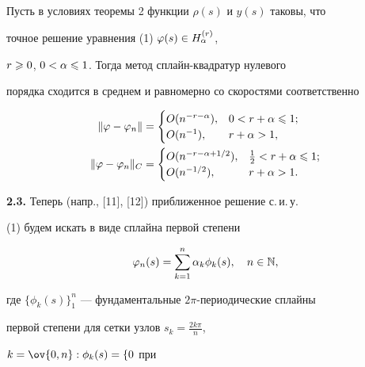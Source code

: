 \begin{cornonum}


Пусть в условиях теоремы 2 функции $\rho(s)$ и $y(s)$ таковы, что 


точное решение уравнения (1) $\varphi(s)\in H_\alpha^{(r)}$,


$r\geqslant 0$, $0<\alpha\leqslant 1$. Тогда метод сплайн-квадратур нулевого 


порядка сходится в среднем и равномерно со скоростями соответственно


\begin{align*}


\|\vp-\vp_n\| &=


\begin{cases}


O(n^{-r-\alpha}),& 0<r+\alpha\lea 1;\\


O(n^{-1}),&r+\alpha>1,


\end{cases}


\\


\|\vp-\vp_n\|_C &=


\begin{cases}


O(n^{-r-\alpha+1/2}),& \frac{1}{2}<r+\alpha\lea 1;\\


O(n^{-1/2}),&r+\alpha>1.


\end{cases}


\end{align*}


\end{cornonum}





{\bf 2.3.} Теперь (напр., [11], [12]) приближенное решение с.\,и.\,у.


(1) будем искать в виде сплайна первой степени


\begin{equation}


\vp_n(s) = \suml_{k=1}^n\alpha_k\phi_k(s),\quad n\in\N,


\end{equation}


где $\{\phi_k(s)\}_1^n$ --- фундаментальные $2\pi$-периодические сплайны 


первой степени для сетки узлов $s_k=\frac{2k\pi}{n}$,


$k=\ov{0,n}:\phi_k(s) = \{0$ при


